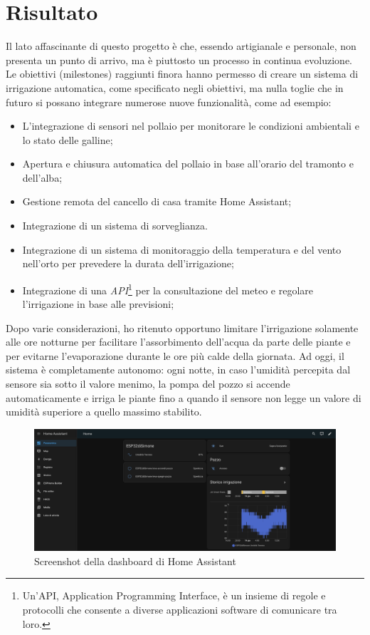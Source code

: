 \documentclass[11pt, a4paper]{article}
\begin{document}
\section{Risultato}
Il lato affascinante di questo progetto è che, essendo artigianale e personale, non presenta
un punto di arrivo, ma è piuttosto un processo in continua evoluzione. Le obiettivi (milestones) raggiunti finora
hanno permesso di creare un sistema di irrigazione automatica, come specificato negli obiettivi,
ma nulla toglie che in futuro si possano integrare numerose nuove funzionalità, come ad esempio:
\begin{itemize}
    \item L'integrazione di sensori nel pollaio per monitorare le condizioni ambientali e lo stato delle galline;
    \item Apertura e chiusura automatica del pollaio in base all'orario del tramonto e dell'alba;
    \item Gestione remota del cancello di casa tramite Home Assistant;
    \item Integrazione di un sistema di sorveglianza.
    \item Integrazione di un sistema di monitoraggio della temperatura e del vento nell'orto 
            per prevedere la durata dell'irrigazione;
    \item Integrazione di una \textit{API}\footnote{Un'API, Application Programming Interface, 
            è un insieme di regole e protocolli che consente a diverse applicazioni software di comunicare tra loro.}
            per la consultazione del meteo e regolare l'irrigazione in base alle previsioni;
\end{itemize}
Dopo varie considerazioni, ho ritenuto opportuno limitare l'irrigazione solamente
alle ore notturne per facilitare l'assorbimento dell'acqua da parte delle piante e per evitarne
l'evaporazione durante le ore più calde della giornata.
Ad oggi, il sistema è completamente autonomo: ogni notte, in caso l'umidità percepita dal sensore
sia sotto il valore menimo, la pompa del pozzo si accende automaticamente e irriga le piante
fino a quando il sensore non legge un valore di umidità superiore a quello massimo stabilito.

\begin{figure}
    
    \centering
    \includegraphics[width=1\textwidth]{media/dashboard-home-assistant.png}
    \caption{Screenshot della dashboard di Home Assistant}
    \label{fig:dashboard-home-assistant}

\end{figure}
\end{document}
